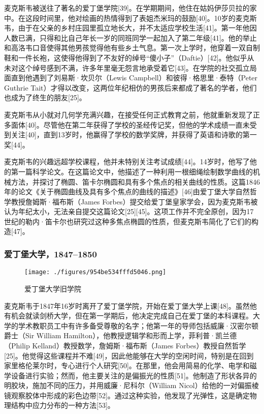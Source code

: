 麦克斯韦被送往了著名的爱丁堡学院[39]。在学期期间，他住在姑妈伊莎贝拉的家中。在这段时间里，他对绘画的热情得到了表姐杰米玛的鼓励[40]。10岁的麦克斯韦，由于在父亲的乡村庄园里孤立地长大，并不太适应学校生活[41]。第一年他因人数已满，只得和比自己年长一岁的同班同学一起加入了第二年级[41]。他的举止和高洛韦口音使得其他男孩觉得他有些乡土气息。第一次上学时，他穿着一双自制鞋和一件长袍，这使得他得到了不友好的绰号“傻小子”（Daftie）[42]。他似乎从未对这个绰号感到不满，许多年里毫无怨言地承受着它[43]。在学院的社交孤立局面直到他遇到了刘易斯·坎贝尔（Lewis Campbell）和彼得·格思里·泰特（Peter Guthrie Tait）才得以改变，这两位年纪相仿的男孩后来都成了著名的学者，他们也成为了终生的朋友[25]。

麦克斯韦从小就对几何学充满兴趣，在接受任何正式教育之前，他就重新发现了正多面体[40]。尽管他在第二年获得了学校的圣经传记奖，但他的学术成绩一直未受到关注[40]，直到13岁时，他赢得了学校的数学奖牌，并获得了英语和诗歌的第一奖[44]。

麦克斯韦的兴趣远超学校课程，他并未特别关注考试成绩[44]。14岁时，他写了他的第一篇科学论文。在这篇论文中，他描述了一种利用一根细绳绘制数学曲线的机械方法，并探讨了椭圆、笛卡尔椭圆和具有多个焦点的相关曲线的性质。这篇1846年的论文《关于椭圆曲线及具有多个焦点的曲线的描述》[46]由爱丁堡大学自然哲学教授詹姆斯·福布斯（James Forbes）提交给爱丁堡皇家学会，因为麦克斯韦被认为年纪太小，无法亲自提交这篇论文[25][45]。这项工作并不完全原创，因为17世纪的勒内·笛卡尔也研究过这种多焦点椭圆的性质，但麦克斯韦简化了它们的构造[47]。
\subsubsection{爱丁堡大学，1847–1850}
\begin{figure}[ht]
\centering
\texttt{[image: ./figures/954be534fffd5046.png]}
\caption{爱丁堡大学旧学院} \label{fig_Clerk_6}
\end{figure}
麦克斯韦于1847年16岁时离开了爱丁堡学院，开始在爱丁堡大学上课[48]。虽然他有机会就读剑桥大学，但在第一学期后，他决定完成自己在爱丁堡的本科课程。大学的学术教职员工中有许多备受尊敬的名字；他第一年的导师包括威廉·汉密尔顿爵士（Sir William Hamilton），他教授逻辑学和形而上学，菲利普·凯兰德（Philip Kelland）教授数学，詹姆斯·福布斯（James Forbes）教授自然哲学[25]。他觉得这些课程并不难[49]，因此他能够在大学的空闲时间，特别是在回到家里格伦莱尔时，专心进行个人研究[50]。在那里，他会用简易的化学、电学和磁学设备进行实验；然而，他主要关注的是偏振光的性质[51]。他制造了形状各异的明胶块，施加不同的压力，并用威廉·尼科尔（William Nicol）给他的一对偏振棱镜观察胶体中形成的彩色边带[52]。通过这种实验，他发现了光弹性，这是确定物理结构中应力分布的一种方法[53]。

